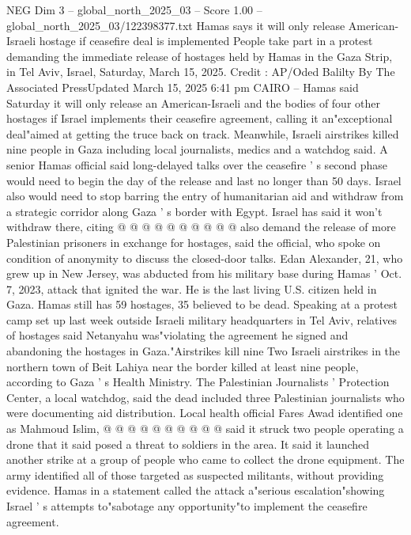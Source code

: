 \begin{textsample}{NEG Dim 3 – global\_north\_2025\_03 – Score 1.00 – global\_north\_2025\_03/122398377.txt}  \label{ex:f3_neg_438}
Hamas says it will only release American-Israeli hostage if ceasefire deal is implemented People take part in a protest demanding the immediate release of hostages held by Hamas in the Gaza Strip, in Tel Aviv, Israel, Saturday, March 15, 2025.
Credit : AP/Oded Balilty By The Associated PressUpdated March 15, 2025 6:41 pm CAIRO -- Hamas said Saturday it will only release an American-Israeli and the bodies of four other hostages if Israel implements their ceasefire agreement, calling it an"exceptional deal"aimed at getting the truce back on track.
Meanwhile, Israeli airstrikes killed nine people in Gaza including local journalists, medics and a watchdog said.
A senior Hamas official said long-delayed talks over the ceasefire ' s second phase would need to begin the day of the release and last no longer than 50 days.
Israel also would need to stop barring the entry of humanitarian aid and withdraw from a strategic corridor along Gaza ' s border with Egypt.
Israel has said it won't withdraw there, citing @ @ @ @ @ @ @ @ @ @ also demand the release of more Palestinian prisoners in exchange for hostages, said the official, who spoke on condition of anonymity to discuss the closed-door talks.
Edan Alexander, 21, who grew up in New Jersey, was abducted from his military base during Hamas ' Oct. 7, 2023, attack that ignited the war.
He is the last living U.S. citizen held in Gaza.
Hamas still has 59 hostages, 35 believed to be dead.
Speaking at a protest camp set up last week outside Israeli military headquarters in Tel Aviv, relatives of hostages said Netanyahu was"violating the agreement he signed and abandoning the hostages in Gaza."Airstrikes kill nine Two Israeli airstrikes in the northern town of Beit Lahiya near the border killed at least nine people, according to Gaza ' s Health Ministry.
The Palestinian Journalists ' Protection Center, a local watchdog, said the dead included three Palestinian journalists who were documenting aid distribution.
Local health official Fares Awad identified one as Mahmoud Islim, @ @ @ @ @ @ @ @ @ @ said it struck two people operating a drone that it said posed a threat to soldiers in the area.
It said it launched another strike at a group of people who came to collect the drone equipment.
The army identified all of those targeted as suspected militants, without providing evidence.
Hamas in a statement called the attack a"serious escalation"showing Israel ' s attempts to"sabotage any opportunity"to implement the ceasefire agreement.

\end{textsample}
